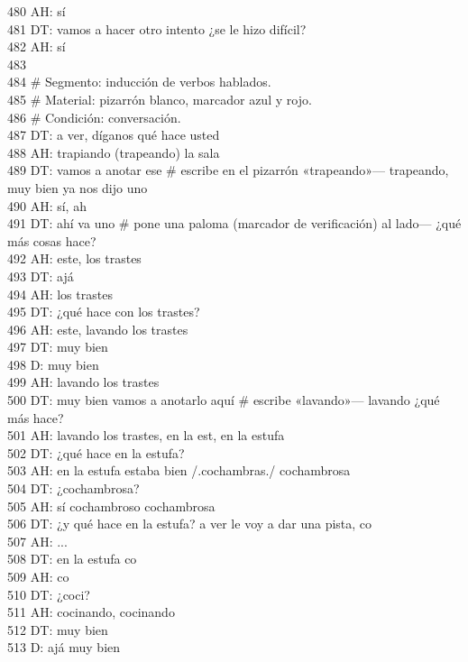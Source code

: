 480 AH: sí\\
481 DT: vamos a hacer otro intento ¿se le hizo difícil?\\
482 AH: sí\\
483 \\
484 \# Segmento: inducción de verbos hablados.\\
485 \# Material: pizarrón blanco, marcador azul y rojo.\\
486 \# Condición: conversación.\\
487 DT: a ver, díganos qué hace usted\\
488 AH: trapiando (trapeando) la sala\\
489 DT: vamos a anotar ese \# escribe en el pizarrón «trapeando»--- trapeando, muy bien ya nos dijo uno\\
490 AH: sí, ah\\
491 DT: ahí va uno \# pone una paloma (marcador de verificación) al lado--- ¿qué más cosas hace?\\
492 AH: este, los trastes\\
493 DT: ajá\\
494 AH: los trastes\\
495 DT: ¿qué hace con los trastes?\\
496 AH: este, lavando los trastes\\
497 DT: muy bien\\
498 D: muy bien\\
499 AH: lavando los trastes\\
500 DT: muy bien vamos a anotarlo aquí \# escribe «lavando»--- lavando ¿qué más hace?\\
501 AH: lavando los trastes, en la est, en la estufa\\
502 DT: ¿qué hace en la estufa?\\
503 AH: en la estufa estaba bien /.cochambras./ cochambrosa\\
504 DT: ¿cochambrosa?\\
505 AH: sí cochambroso cochambrosa\\
506 DT: ¿y qué hace en la estufa? a ver le voy a dar una pista, co\\
507 AH: ...\\
508 DT: en la estufa co\\
509 AH: co\\
510 DT: ¿coci?\\
511 AH: cocinando, cocinando\\
512 DT: muy bien\\
513 D: ajá muy bien\\
